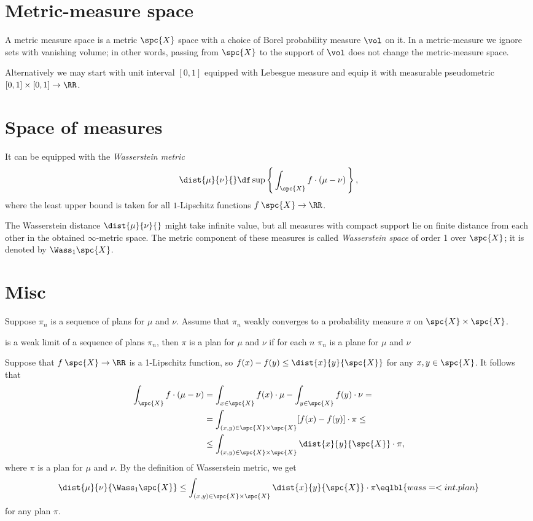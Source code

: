 \qeds

\section{Metric-measure space}

A metric measure space is a metric $\spc{X}$ space with a choice of Borel probability measure $\vol$ on it.
In a metric-measure we ignore sets with vanishing volume; in other words, passing from $\spc{X}$ to the support of $\vol$ does not change the metric-measure space.

Alternatively we may start with unit interval $[0,1]$ equipped with Lebesgue measure and equip it with measurable pseudometric $[0,1]\times [0,1]\to \RR$.





\section{Space of measures}


It can be equipped with the \emph{Wasserstein metric}
\[\dist{\mu}{\nu}{}\df\sup\left\{\,\int_{\spc{X}} f\cdot(\mu-\nu)\,\right\},\]
where the least upper bound is taken for all $1$-Lipschitz functions $f\:\spc{X}\to\RR$.

The Wasserstein distance $\dist{\mu}{\nu}{}$ might take infinite value, but all measures with compact support lie on finite distance from each other in the obtained $\infty$-metric space.
The metric component of these measures is called \emph{Wasserstein space} of order 1 over $\spc{X}$; 
it is denoted by $\Wass_1\spc{X}$.



\section{Misc}

Suppose $\pi_n$ is a sequence of plans for $\mu$ and $\nu$.
Assume that $\pi_n$ weakly converges to a probability measure $\pi$ on $\spc{X}\times\spc{X}$.

is a weak limit of a sequence of plans $\pi_n$, then $\pi$ is a plan for $\mu$ and $\nu$ if for each $n$ $\pi_n$ is a plane for $\mu$ and $\nu$ 

Suppose that $f\:\spc{X}\to \RR$ is a 1-Lipschitz function,
so $f(x)-f(y)\le\dist{x}{y}{\spc{X}}$ for any $x,y\in \spc{X}$.
It follows that 
\begin{align*}
\int_{\spc{X}} f\cdot(\mu-\nu)&=\int_{x\in\spc{X}}f(x)\cdot\mu-\int_{y\in\spc{X}}f(y)\cdot\nu=
\\
&=\int_{(x,y)\in\spc{X}\times\spc{X}}[f(x)-f(y)]\cdot \pi\le
\\
&\le\int_{(x,y)\in\spc{X}\times\spc{X}}\dist{x}{y}{\spc{X}}\cdot \pi,
\end{align*}
where $\pi$ is a plan for $\mu$ and $\nu$.
By the definition of Wasserstein metric, we get  
\[\dist{\mu}{\nu}{\Wass_1\spc{X}}\le \int_{(x,y)\in\spc{X}\times\spc{X}}\dist{x}{y}{\spc{X}}\cdot\pi\eqlbl{wass=<int.plan}\]
for any plan $\pi$.

